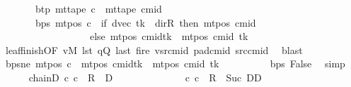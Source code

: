\begin{isabellebody}
\ \ \ \ \ \ \ btp{\isacharcolon}{\kern0pt}\ {\isachardoublequoteopen}mt{\isacharunderscore}{\kern0pt}tape\ c{\isacharprime}{\kern0pt}\ {\isacharequal}{\kern0pt}\ mt{\isacharunderscore}{\kern0pt}tape\ cmid{\isachardoublequoteclose}\isanewline
\ \ \ \ \ \ \ bps{\isacharcolon}{\kern0pt}\ {\isachardoublequoteopen}mt{\isacharunderscore}{\kern0pt}pos\ c{\isacharprime}{\kern0pt}\ {\isacharequal}{\kern0pt}\ {\isacharparenleft}{\kern0pt}if\ dvec\ tk\ {\isacharequal}{\kern0pt}\ dir{\isachardot}{\kern0pt}R\ then\ mt{\isacharunderscore}{\kern0pt}pos\ cmid\isanewline
\ \ \ \ \ \ \ \ \ \ \ \ \ \ \ \ \ \ else\ {\isacharparenleft}{\kern0pt}mt{\isacharunderscore}{\kern0pt}pos\ cmid{\isacharparenright}{\kern0pt}{\isacharparenleft}{\kern0pt}tk\ {\isacharcolon}{\kern0pt}{\isacharequal}{\kern0pt}\ mt{\isacharunderscore}{\kern0pt}pos\ cmid\ tk\ {\isacharminus}{\kern0pt}\ {}{\isacharparenright}{\kern0pt}{\isacharparenright}{\kern0pt}{\isachardoublequoteclose}\isanewline
\ \ \ \ \ \ \isamarkupfalse%
\ leaf{\isacharunderscore}{\kern0pt}finish{\isacharbrackleft}{\kern0pt}OF\ vM\ lst\ qQ\ last\ fire\ vsrcmid\ pad{\isacharunderscore}{\kern0pt}cmid\ src{\isacharunderscore}{\kern0pt}cmid{\isacharbrackright}{\kern0pt}\ \isamarkupfalse%
\ blast\isanewline
\ \ \ \ \isamarkupfalse%
\ bps{\isacharunderscore}{\kern0pt}ne{\isacharcolon}{\kern0pt}\ {\isachardoublequoteopen}mt{\isacharunderscore}{\kern0pt}pos\ c{\isacharprime}{\kern0pt}\ {\isacharequal}{\kern0pt}\ {\isacharparenleft}{\kern0pt}mt{\isacharunderscore}{\kern0pt}pos\ cmid{\isacharparenright}{\kern0pt}{\isacharparenleft}{\kern0pt}tk\ {\isacharcolon}{\kern0pt}{\isacharequal}{\kern0pt}\ mt{\isacharunderscore}{\kern0pt}pos\ cmid\ tk\ {\isacharminus}{\kern0pt}\ {}{\isacharparenright}{\kern0pt}{\isachardoublequoteclose}\isanewline
\ \ \ \ \ \ \isamarkupfalse%
\ bps\ False\ \isamarkupfalse%
\ simp\isanewline
\ \ \ \ \isamarkupfalse%
\ chainD{\isacharcolon}{\kern0pt}\ {\isachardoublequoteopen}{\isacharparenleft}{\kern0pt}c{}{\isacharcomma}{\kern0pt}\ c{\isacharprime}{\kern0pt}{\isacharparenright}{\kern0pt}\ {\isasymin}\ {\isacharquery}{\kern0pt}R\ {\isacharcircum}{\kern0pt}{\isacharcircum}{\kern0pt}\ {\isacharquery}{\kern0pt}D{\isachardoublequoteclose}\isanewline
\ \ \ \ \isamarkupfalse%
\ {\isacharminus}{\kern0pt}\isanewline
\ \ \ \ \ \ \isamarkupfalse%
\ {\isachardoublequoteopen}{\isacharparenleft}{\kern0pt}c{}{\isacharcomma}{\kern0pt}\ c{\isacharprime}{\kern0pt}{\isacharparenright}{\kern0pt}\ {\isasymin}\ {\isacharquery}{\kern0pt}R\ {\isacharcircum}{\kern0pt}{\isacharcircum}{\kern0pt}\ Suc\ DD{\isachardoublequoteclose}\ \isamarkupfalse%

\end{isabellebody}
